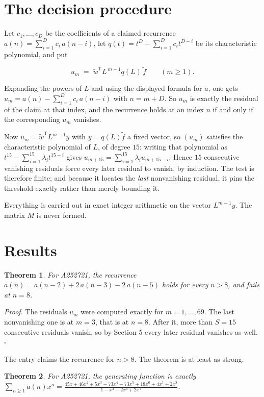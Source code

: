 \documentclass[11pt]{article}
\newtheorem{theorem}{Theorem}
\theoremstyle{definition}
\begin{document}
\section{The decision procedure}

Let $c_1,\dots,c_D$ be the coefficients of a claimed recurrence $a(n) = \sum_{i=1}^{D} c_i\,a(n-i)$, let $q(t) = t^{D} - \sum_{i=1}^{D} c_i t^{D-i}$ be its characteristic polynomial, and put

\[u_m \;=\; \tilde w^{\mathsf T} L^{\,m-1} q(L)\,\tilde f \qquad (m \ge 1).\]

Expanding the powers of $L$ and using the displayed formula for $a$, one gets $u_m = a(n) - \sum_{i=1}^{D} c_i\,a(n-i)$ with $n = m + D$. So $u_m$ is exactly the residual of the claim at that index, and the recurrence holds at an index $n$ if and only if the corresponding $u_m$ vanishes.

Now $u_m = \tilde w^{\mathsf T} L^{m-1} y$ with $y = q(L)\tilde f$ a fixed vector, so $(u_m)$ satisfies the characteristic polynomial of $L$, of degree $15$: writing that polynomial as $t^{15} - \sum_{i=1}^{15} \lambda_i t^{15-i}$ gives $u_{m+15} = \sum_{i=1}^{15} \lambda_i u_{m+15-i}$. Hence $15$ consecutive vanishing residuals force every later residual to vanish, by induction. The test is therefore finite; and because it locates the {\itshape last} nonvanishing residual, it pins the threshold exactly rather than merely bounding it.

Everything is carried out in exact integer arithmetic on the vector $L^{m-1}y$. The matrix $M$ is never formed.

\section{Results}

\begin{theorem} For A252721, the recurrence $a(n) = a(n-2) + 2\,a(n-3) - 2\,a(n-5)$ holds for every $n > 8$, and fails at $n = 8$.\end{theorem}

{\itshape Proof.} The residuals $u_m$ were computed exactly for $m = 1,\dots,69$. The last nonvanishing one is at $m = 3$, that is at $n = 8$. After it, more than $S = 15$ consecutive residuals vanish, so by Section 5 every later residual vanishes as well. $\square$

The entry claims the recurrence for $n > 8$. The theorem is at least as strong.

\begin{theorem} For A252721, the generating function is exactly $\sum_{n\ge 1} a(n)x^n = \frac{45x + 46x^{2} + 5x^{3} - 73x^{4} - 73x^{5} + 18x^{6} + 4x^{7} + 2x^{8}}{1 - x^{2} - 2x^{3} + 2x^{5}}$.\end{theorem}
\end{document}
